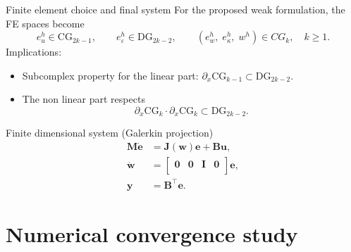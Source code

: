 \documentclass[serif]{beamer} %
\begin{document}
\begin{frame}{Finite element choice and final system}
	For the proposed weak formulation, the FE spaces become
	\begin{equation*}
			e_u^h \in \mathrm{CG}_{2k-1}, \qquad
			e_{\varepsilon}^h \in \mathrm{DG}_{2k-2}, \qquad 
			(e_w^h, \; e_\kappa^h, \; w^h) \in CG_{k}, \quad k\ge 1.
	\end{equation*}
Implications:
\begin{itemize}
	\item Subcomplex property for the linear part: $\partial_x \mathrm{CG}_{k-1} \subset \mathrm{DG}_{2k-2}$.
	\item The non linear part respects
	$$\partial_x \mathrm{CG}_k \cdot  \partial_x \mathrm{CG}_k \subset \mathrm{DG}_{2k-2}.$$
\end{itemize}

\begin{block}{Finite dimensional system (Galerkin projection)}
		\begin{equation*}
		\begin{aligned}
			\mathbf{M} \dot{\mathbf{e}} &= \mathbf{J}(\mathbf{w})\mathbf{e} + \mathbf{B}\mathbf{u}, \\
			\dot{\mathbf{w}} &= \begin{bmatrix}
				\mathbf{0} & \mathbf{0} & \mathbf{I} & \mathbf{0} \\
			\end{bmatrix} \mathbf{e}, \\
			\mathbf{y} &= \mathbf{B}^\top \mathbf{e}.
		\end{aligned}
	\end{equation*}
\end{block}

\end{frame}


\section{Numerical convergence study}
\end{document}
